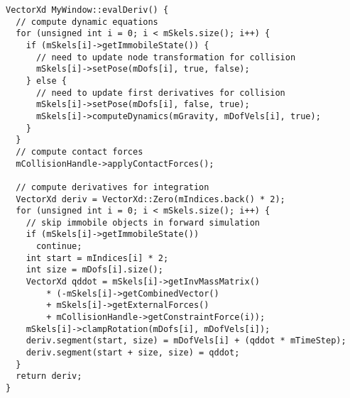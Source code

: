 \ttfamily
\begin{lstlisting}[label=evalDeriv,caption=evalDeriv]
VectorXd MyWindow::evalDeriv() {
  // compute dynamic equations
  for (unsigned int i = 0; i < mSkels.size(); i++) {
    if (mSkels[i]->getImmobileState()) {
      // need to update node transformation for collision
      mSkels[i]->setPose(mDofs[i], true, false);
    } else {
      // need to update first derivatives for collision
      mSkels[i]->setPose(mDofs[i], false, true);
      mSkels[i]->computeDynamics(mGravity, mDofVels[i], true);
    }
  }
  // compute contact forces
  mCollisionHandle->applyContactForces();

  // compute derivatives for integration
  VectorXd deriv = VectorXd::Zero(mIndices.back() * 2);    
  for (unsigned int i = 0; i < mSkels.size(); i++) {
    // skip immobile objects in forward simulation
    if (mSkels[i]->getImmobileState())
      continue;
    int start = mIndices[i] * 2;
    int size = mDofs[i].size();
    VectorXd qddot = mSkels[i]->getInvMassMatrix() 
        * (-mSkels[i]->getCombinedVector() 
        + mSkels[i]->getExternalForces() 
        + mCollisionHandle->getConstraintForce(i));
    mSkels[i]->clampRotation(mDofs[i], mDofVels[i]);
    deriv.segment(start, size) = mDofVels[i] + (qddot * mTimeStep);
    deriv.segment(start + size, size) = qddot;
  }
  return deriv;
}
\end{lstlisting}
\rmfamily




